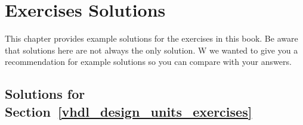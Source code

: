 %
%
\chapter{Exercises Solutions}
This chapter provides example solutions for the exercises in this book. Be aware that solutions here are not always the only solution. W we wanted to give you a recommendation for example solutions so you can compare with your answers.

\section{Solutions for Section~\ref{vhdl_design_units_exercises}}
